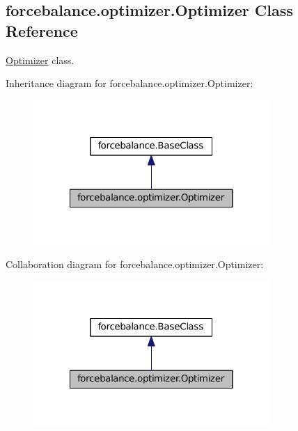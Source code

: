 \hypertarget{classforcebalance_1_1optimizer_1_1Optimizer}{\subsection{forcebalance.\-optimizer.\-Optimizer \-Class \-Reference}
\label{classforcebalance_1_1optimizer_1_1Optimizer}
}


\hyperlink{classforcebalance_1_1optimizer_1_1Optimizer}{\-Optimizer} class.  




\-Inheritance diagram for forcebalance.\-optimizer.\-Optimizer\-:
\nopagebreak
\begin{figure}[H]
\begin{center}
\leavevmode
\includegraphics[width=254pt]{classforcebalance_1_1optimizer_1_1Optimizer__inherit__graph}
\end{center}
\end{figure}


\-Collaboration diagram for forcebalance.\-optimizer.\-Optimizer\-:
\nopagebreak
\begin{figure}[H]
\begin{center}
\leavevmode
\includegraphics[width=254pt]{classforcebalance_1_1optimizer_1_1Optimizer__coll__graph}
\end{center}
\end{figure}
